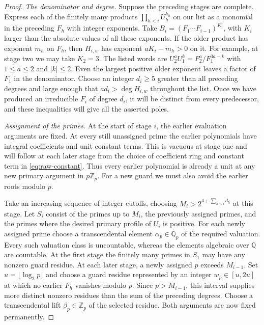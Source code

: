 \begin{proof}
    \emph{The denominator and degree.}
    Suppose the preceding stages are complete.
    Express each of the finitely many products $\prod_{h < i} U_h^{k_h}$ on our list as a monomial in the preceding $F_h$ with integer exponents.
    Take $B_i = (F_1 \cdots F_{i - 1})^{K_i}$, with $K_i$ larger than the absolute values of all these exponents.
    If the older product has exponent $m_h$ on $F_h$, then $H_{i, w}$ has exponent $aK_i - m_h > 0$ on it.
    For example, at stage two we may take $K_2 = 3$.
    The listed words are $U_2^a U_1^k = F_2^a/F_1^{3a - k}$ with $1 \le a \le 2$ and $|k| \le 2$.
    Even the largest positive older exponent leaves a factor of $F_1$ in the denominator.
    Choose an integer $d_i \ge 5$ greater than all preceding degrees and large enough that $a d_i > \deg H_{i, w}$ throughout the list.
    Once we have produced an irreducible $F_i$ of degree $d_i$, it will be distinct from every predecessor, and these inequalities will give all the asserted poles.

    \emph{Assignment of the primes.}
    At the start of stage $i$, the earlier evaluation arguments are fixed.
    At every still unassigned prime the earlier polynomials have integral coefficients and unit constant terms.
    This is vacuous at stage one and will follow at each later stage from the choice of coefficient ring and constant term in \eqref{eq:raw-constant}.
    Thus every earlier polynomial is already a unit at any new primary argument in $p\mathbb{Z}_p$.
    For a new guard we must also avoid the earlier roots modulo $p$.

    Take an increasing sequence of integer cutoffs, choosing $M_i > 2^{4 + \sum_{h \le i} d_h}$ at this stage.
    Let $S_i$ consist of the primes up to $M_i$, the previously assigned primes, and the primes where the desired primary profile of $U_i$ is positive.
    For each newly assigned prime choose a transcendental element $\alpha_p \in \mathbb{Q}_p$ of the required valuation.
    Every such valuation class is uncountable, whereas the elements algebraic over $\mathbb{Q}$ are countable.
    At the first stage the finitely many primes in $S_1$ may have any nonzero guard residue.
    At each later stage, a newly assigned $p$ exceeds $M_{i - 1}$.
    Set $u = \lfloor\log_2 p\rfloor$ and choose a guard residue represented by an integer $w_p \in [u, 2u]$ at which no earlier $F_h$ vanishes modulo $p$.
    Since $p > M_{i - 1}$, this interval supplies more distinct nonzero residues than the sum of the preceding degrees.
    Choose a transcendental lift $\beta_p \in \mathbb{Z}_p$ of the selected residue.
    Both arguments are now fixed permanently.


\end{proof}
